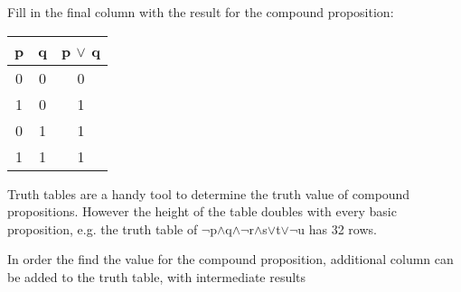 \documentclass[10pt,a4paper,draft,titlepage,onecolumn]{book}
\begin{document}
Fill in the final column with the result for the compound proposition:

\begin{center}
\begin{tabular}{ |c|c|c| }
 \hline
 p & q &  p $\vee$ q  \\
 \hline
 0 & 0 & 0\\
 1 & 0 & 1\\
 0 & 1 & 1\\
 1 & 1 & 1\\
 \hline
\end{tabular}
\end{center}

Truth tables are a handy tool to determine the truth value of compound propositions. However the height of the table doubles with every basic proposition, e.g. the truth table of {$\neg$}p{$\wedge$}q{$\wedge$}{$\neg$}r{$\wedge$}s{$\vee$}t{$\vee$}{$\neg$}u has 32 rows.


In order the find the value for the compound proposition, additional column can be added to the truth table, with intermediate results
\end{document}
